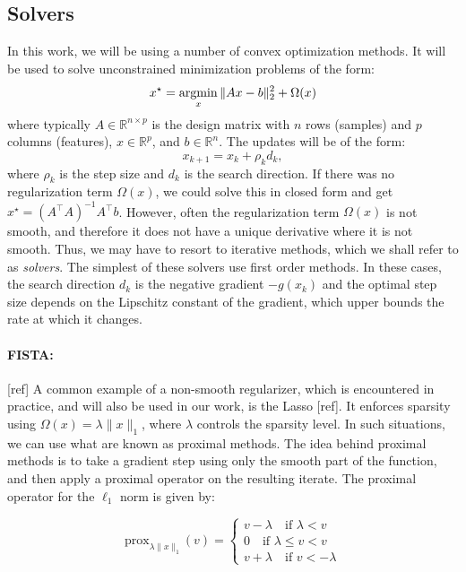 \subsection{Solvers}
In this work, we will be using a number of convex optimization methods. It will be used to solve unconstrained minimization problems of the form:
\begin{equation}
x^{\star} = \mathop{\mathrm{argmin}}_x \|Ax - b\|_{2}^2 + \Omega(x)
\end{equation}
%
where typically $A \in \mathbb{R}^{n \times p}$ is the design matrix with $n$ rows (samples) and $p$ columns (features), $x \in \mathbb{R}^p$, and $b \in \mathbb{R}^n$. The updates will be of the  form:
%
\begin{equation}
x_{k + 1} = x_{k} + \rho_k d_k,
\end{equation}
%
where $\rho_k$ is the step size and $d_k$ is the search direction.
If there was no regularization term $\Omega(x)$, we could solve this in closed form and get $x^{\star} = {(A^{\top}A)}^{-1}A^{\top}b$. However, often the regularization term $\Omega(x)$ is not smooth, and therefore it does not have a unique derivative where it is not smooth. Thus, we may have to resort to iterative methods, which we shall refer to as \emph{solvers}. The simplest of these solvers use first order methods. In these cases, the search direction $d_k$ is the negative gradient $-g(x_k)$ and the optimal step size depends on the Lipschitz constant of the gradient, which upper bounds the rate at which it changes. 

\paragraph{FISTA: }[ref] A common example of a non-smooth regularizer, which is encountered in practice, and will also be used in our work, is the Lasso [ref]. It enforces sparsity using $\Omega(x) = \lambda \|x\|_1$, where $\lambda$ controls the sparsity level. In such situations, we can use what are known as proximal methods. The idea behind proximal methods is to take a gradient step using only the smooth part of the function, and then apply a proximal operator on the resulting iterate. The proximal operator for the $\ell_1$ norm is given by:

\begin{equation}
\mathrm{prox}_{\lambda \|x\|_1}(v) = \begin{cases}
v - \lambda \quad \text{if } \lambda < v \\
0 \quad \text{if } \lambda \leq v < v\\
v + \lambda \quad \text{if } v < -\lambda
\end{cases}
\end{equation}

